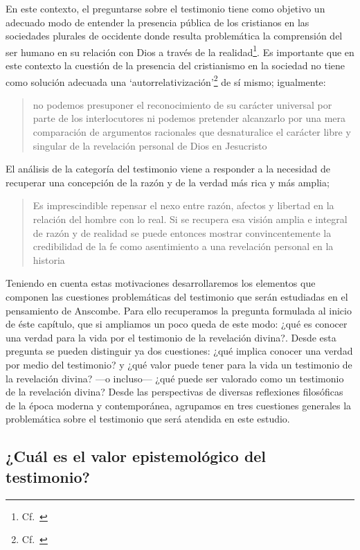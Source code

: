 En este contexto, el preguntarse sobre el testimonio tiene como objetivo un adecuado modo de entender la presencia pública de los cristianos en las sociedades plurales de occidente donde resulta problemática la comprensión del ser humano en su relación con Dios a través de la realidad\footnote{Cf.~\cite[75]{prades2015testimonio}}. Es importante que en este contexto la cuestión de la presencia del cristianismo en la sociedad no tiene como solución adecuada una `autorrelativización'\footnote{Cf.~\cite[75;\,40-44]{prades2015testimonio}} de sí mismo; igualmente: \blockquote[{\cite[75; Cf.~33-40]{prades2015testimonio}}]{no podemos presuponer el reconocimiento de su carácter universal por parte de los interlocutores ni podemos pretender alcanzarlo por una mera comparación de argumentos racionales que desnaturalice el carácter libre y singular de la revelación personal de Dios en Jesucristo}. El análisis de la categoría del testimonio viene a responder a la necesidad de recuperar una concepción de la razón y de la verdad más rica y más amplia; \blockquote[{\cite[76]{prades2015testimonio}}]{Es imprescindible repensar el nexo entre razón, afectos y libertad en la relación del hombre con lo real. Si se recupera esa visión amplia e integral de razón y de realidad se puede entonces mostrar convincentemente la credibilidad de la fe como asentimiento a una revelación personal en la historia}.

Teniendo en cuenta estas motivaciones desarrollaremos los elementos que componen las cuestiones problemáticas del testimonio que serán estudiadas en el pensamiento de Anscombe. Para ello recuperamos la pregunta formulada al inicio de éste capítulo, que si ampliamos un poco queda de este modo: ¿qué es conocer una verdad para la vida por el testimonio de la revelación divina?. Desde esta pregunta se pueden distinguir ya dos cuestiones: ¿qué implica conocer una verdad por medio del testimonio? y ¿qué valor puede tener para la vida un testimonio de la revelación divina? ---o incluso--- ¿qué puede ser valorado como un testimonio de la revelación divina? Desde las perspectivas de diversas reflexiones filosóficas de la época moderna y contemporánea, agrupamos en tres cuestiones generales la problemática sobre el testimonio que será atendida en este estudio.

\subsection{¿Cuál es el valor epistemológico del testimonio?}

